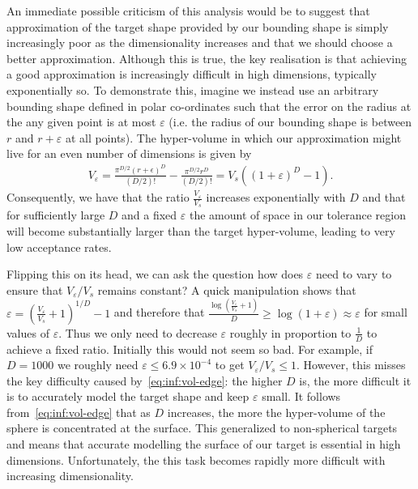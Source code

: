 An immediate possible criticism of this analysis would be to suggest that approximation of the
target shape provided by our bounding shape is simply increasingly poor as the dimensionality 
increases and that we should choose 
a better approximation.  Although this is true, the key realisation is that achieving a good approximation
is increasingly difficult in high dimensions, typically exponentially so.
To demonstrate this, imagine we instead use an arbitrary bounding shape defined in polar
co-ordinates such that the error on the radius at the any given point is at most $\varepsilon$
(i.e. the radius of our bounding shape is between $r$ and $r+\varepsilon$ at all points).
The hyper-volume in which our approximation might live for an even number of dimensions
is given by
\begin{align}
\label{eq:inf:vol-edge}
V_{\varepsilon} = \frac{\pi^{D/2}(r+\epsilon)^D}{(D/2)!}-\frac{\pi^{D/2}r^D}{(D/2)!}
= V_s \left((1+\varepsilon)^D-1\right).
\end{align}
Consequently, we have that the ratio $\frac{V_{\varepsilon}}{V_s}$ increases exponentially with $D$
and that for sufficiently large $D$ and a fixed $\varepsilon$ the amount of space in our tolerance
region will become substantially larger than the target hyper-volume, leading to very low acceptance
rates.

Flipping this on its head, we can ask the question how does $\varepsilon$ need to vary
to ensure that $V_{\varepsilon}/V_s$ remains constant?  A quick manipulation shows
that $\varepsilon = \left(\frac{V_{\varepsilon}}{V_s}+1\right)^{1/D}-1$ and therefore that
$\frac{\log \left(\frac{V_{\varepsilon}}{V_s}+1\right)}{D} \ge \log(1+\varepsilon) \approx \varepsilon$
for small values of $\varepsilon$.  Thus we only need to decrease $\varepsilon$ roughly
in proportion to $\frac{1}{D}$ to achieve a fixed ratio.  Initially this would not seem
so bad.  For example, if $D=1000$ we
roughly need $\varepsilon \le 6.9 \times 10^{-4}$ to get $V_{\varepsilon}/V_s \le 1$.
However, this misses the
key difficulty caused by~\eqref{eq:inf:vol-edge}: the higher $D$ is, the more difficult it is
to accurately model the target shape and keep $\varepsilon$ small.  
It follows from~\eqref{eq:inf:vol-edge} that as $D$ increases, the more the hyper-volume
of the sphere is concentrated at the surface.  This generalized to non-spherical targets and
means that accurate modelling the surface of our target is essential in high dimensions.
Unfortunately, the this task becomes rapidly more difficult with increasing dimensionality.  

